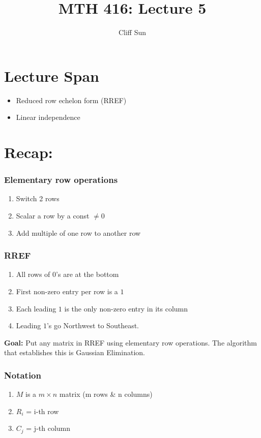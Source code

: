 \documentclass{article}
\title{MTH 416: Lecture 5}
\author{Cliff Sun}
\newtheorem{one minute paper}[theorem]{One Minute Paper}
\begin{document}
\maketitle

\section*{Lecture Span}
\begin{itemize}
    \item Reduced row echelon form (RREF)
    \item Linear independence
\end{itemize}

\section*{Recap:}

\subsubsection*{Elementary row operations}

\begin{enumerate}
    \item Switch 2 rows
    \item Scalar a row by a const $\neq 0$
    \item Add multiple of one row to another row
\end{enumerate}

\subsubsection*{RREF}
\begin{enumerate}
    \item All rows of 0's are at the bottom
    \item First non-zero entry per row is a $1$
    \item Each leading $1$ is the only non-zero entry in its column
    \item Leading $1$'s go Northwest to Southeast. 
\end{enumerate}

\textbf{Goal:} Put any matrix in RREF using elementary row operations. The algorithm that establishes this is Gaussian Elimination.

\subsubsection*{Notation}
\begin{enumerate}
    \item $M$ is a $m \times n$ matrix (m rows \& n columns)
    \item $R_i$ = i-th row
    \item $C_j$ = j-th column
\end{enumerate}
\end{document}
